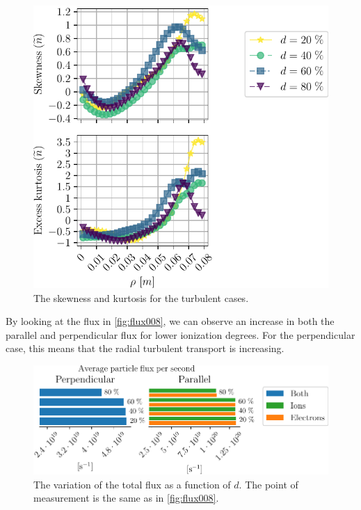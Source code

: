 \begin{figure}[htb]
    \centering
    \includegraphics{fig/results/neutral/nnScanSkewKurt}
    \caption{The skewness and kurtosis for the turbulent cases.}
    \label{fig:nnScanSkewKurt}
\end{figure}
%

By looking at the flux in \cref{fig:flux008}, we can observe an increase in both the parallel and perpendicular flux for lower ionization degrees.
For the perpendicular case, this means that the radial turbulent transport is increasing.
%
\begin{figure}[htb]
    \centering
    \includegraphics{fig/results/neutral/nnScanTotalFlux}
    \caption{
        The variation of the total flux as a function of $d$.
        The point of measurement is the same as in \cref{fig:flux008}.
    }
    \label{fig:nnScanTotalFlux}
\end{figure}
%

